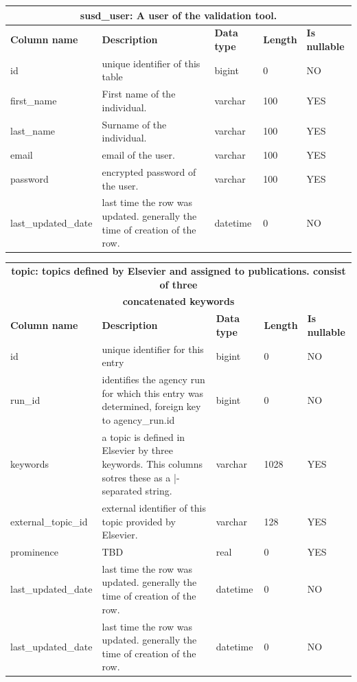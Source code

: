 \documentclass[titlepage, 11pt]{article}
\begin{document}
{\begin{table}[h!]
{\renewcommand{\arraystretch}{1.5}%
\begin{tabularx}{1\textwidth} {|p{4cm}|p{5.33cm}|p{2cm}|p{1.5cm}|p{1.5cm}|}
 \hline
 \multicolumn{5}{|c|}{\textbf{susd\_user: A user of the validation tool.}}\\
 \hline
 \textbf{Column name} & \textbf{Description} & \textbf{Data type} & \textbf{Length} & \textbf{Is nullable} \\
 \hline
 id          & unique identifier of this table & bigint  & 0   & NO  \\
 \hline
first\_name & First name of the individual.   & varchar & 100 & YES \\
\hline
last\_name  & Surname of the individual.      & varchar & 100 & YES \\
\hline
email       & email of the user.              & varchar & 100 & YES \\
\hline
password    & encrypted password of the user. & varchar & 100 & YES \\
\hline
last\_updated\_date & last time the row was updated. generally the time of creation of the row. & datetime & 0 & NO \\
\hline

\end{tabularx}
\label{table: appendix b - susd user}
}
\end{table}

\begin{table}[h!]

{\renewcommand{\arraystretch}{1.5}%
\begin{tabularx}{1\textwidth} {|p{4cm}|p{5.33cm}|p{2cm}|p{1.5cm}|p{1.5cm}|}
 \hline
 \multicolumn{5}{|c|}{\textbf{topic: topics defined by Elsevier and assigned to publications. consist of three}}\\
 \multicolumn{5}{|c|}{\textbf{concatenated keywords}}\\
 \hline
 \textbf{Column name} & \textbf{Description} & \textbf{Data type} & \textbf{Length} & \textbf{Is nullable} \\
 \hline
 id  & unique identifier for this entry & bigint  & 0   & NO  \\
 \hline
 run\_id  & identifies the agency run for which this entry was determined, foreign key to agency\_run.id  & bigint  & 0    & NO  \\
 \hline
 keywords & a topic is defined in Elsevier by three keywords. This columns sotres these as a |-separated string. & varchar & 1028 & YES \\
 \hline
 external\_topic\_id & external identifier of this topic provided by Elsevier. & varchar & 128 & YES \\
\hline
prominence  & TBD  & real     & 0 & YES \\
\hline
last\_updated\_date & last time the row was updated. generally the time of creation of the row. & datetime & 0 & NO  \\
\hline
last\_updated\_date & last time the row was updated. generally the time of creation of the row. & datetime & 0 & NO  \\
\hline


\end{tabularx}}
\end{table}}
\end{document}
